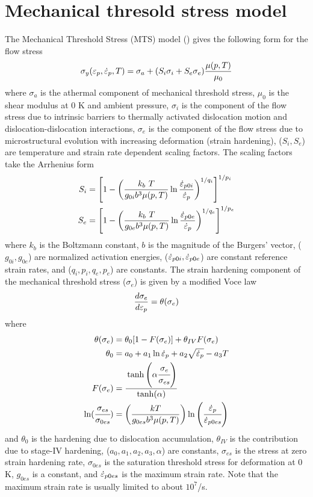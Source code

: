 \section{Mechanical thresold stress model}
The Mechanical Threshold Stress (MTS) model 
(\cite{Follans1988,Goto2000a,Kocks2001})  
gives the following form for the flow stress
\begin{equation}
  \sigma_y(\varepsilon_p,\dot{\varepsilon}_{p},T) = 
    \sigma_a + (S_i \sigma_i + S_e \sigma_e)\frac{\mu(p,T)}{\mu_0} 
\end{equation}
where $\sigma_a$ is the athermal component of mechanical threshold stress,
$\mu_0$ is the shear modulus at 0 K and ambient pressure, 
$\sigma_i$ is the component of the flow stress due to intrinsic barriers 
to thermally activated dislocation motion and dislocation-dislocation 
interactions, $\sigma_e$ is the component of the flow stress due to 
microstructural evolution with increasing deformation (strain hardening), 
($S_i, S_e$) are temperature and strain rate dependent scaling factors.  The
scaling factors take the Arrhenius form
\begin{align}
  S_i & = \left[1 - \left(\frac{k_b~T}{g_{0i}b^3\mu(p,T)}
  \ln\frac{\dot{\varepsilon}_{p0i}}{\dot{\varepsilon}_{p}}\right)^{1/q_i}
  \right]^{1/p_i} \\
  S_e & = \left[1 - \left(\frac{k_b~T}{g_{0e}b^3\mu(p,T)}
  \ln\frac{\dot{\varepsilon}_{p0e}}{\dot{\varepsilon}_{p}}\right)^{1/q_e}
  \right]^{1/p_e}
\end{align}
where $k_b$ is the Boltzmann constant, $b$ is the magnitude of the Burgers' 
vector, ($g_{0i}, g_{0e}$) are normalized activation energies, 
($\dot{\varepsilon}_{p0i}, \dot{\varepsilon}_{p0e}$) are constant reference strain rates, and
($q_i, p_i, q_e, p_e$) are constants.  The strain hardening component
of the mechanical threshold stress ($\sigma_e$) is given by a
modified Voce law
\begin{equation}\label{eq:MTSsige}
  \frac{d\sigma_e}{d\varepsilon_p} = \theta(\sigma_e)
\end{equation}
where
\begin{align}
  \theta(\sigma_e) & = 
     \theta_0 [ 1 - F(\sigma_e)] + \theta_{IV} F(\sigma_e) \\
  \theta_0 & = a_0 + a_1 \ln \dot{\varepsilon}_{p} + a_2 \sqrt{\dot{\varepsilon}_{p}} - a_3 T \\
  F(\sigma_e) & = 
    \cfrac{\tanh\left(\alpha \cfrac{\sigma_e}{\sigma_{es}}\right)}
    {\tanh(\alpha)}\\
  \ln(\cfrac{\sigma_{es}}{\sigma_{0es}}) & =
  \left(\frac{kT}{g_{0es} b^3 \mu(p,T)}\right)
  \ln\left(\cfrac{\dot{\varepsilon}_{p}}{\dot{\varepsilon}_{p0es}}\right)
\end{align}
and $\theta_0$ is the hardening due to dislocation accumulation, 
$\theta_{IV}$ is the contribution due to stage-IV hardening,
($a_0, a_1, a_2, a_3, \alpha$) are constants,
$\sigma_{es}$ is the stress at zero strain hardening rate, 
$\sigma_{0es}$ is the saturation threshold stress for deformation at 0 K,
$g_{0es}$ is a constant, and $\dot{\varepsilon}_{p0es}$ is the maximum strain rate.  Note
that the maximum strain rate is usually limited to about $10^7$/s.

